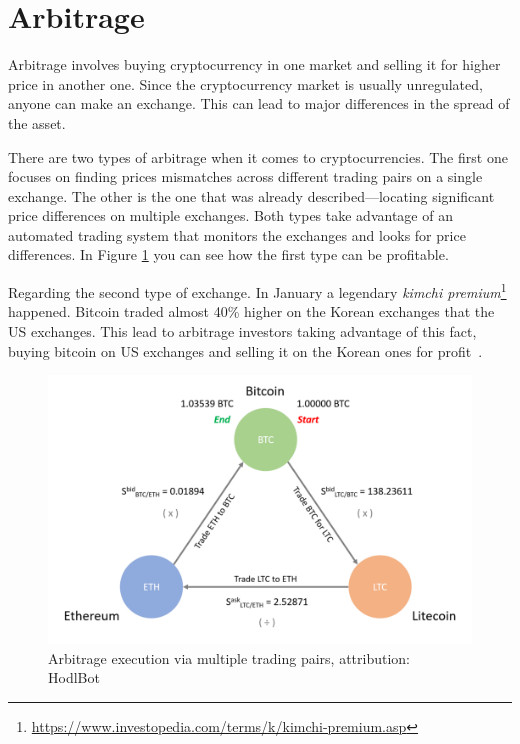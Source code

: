 \section{Arbitrage}
Arbitrage involves buying cryptocurrency in one market and selling it for higher price in another one. Since the cryptocurrency market is usually unregulated, anyone can make an exchange. This can lead to major differences in the spread of the asset.

There are two types of arbitrage when it comes to cryptocurrencies. The first one focuses on finding prices mismatches across different trading pairs on a single exchange. The other is the one that was already described---locating significant price differences on multiple exchanges. Both types take advantage of an automated trading system that monitors the exchanges and looks for price differences. In Figure \ref{arbitrage-figure} you can see how the first type can be profitable.

Regarding the second type of exchange. In January a legendary \emph{kimchi premium}\footnote{\url{https://www.investopedia.com/terms/k/kimchi-premium.asp}} happened. Bitcoin traded almost 40\% higher on the Korean exchanges that the US exchanges. This lead to arbitrage investors taking advantage of this fact, buying bitcoin on US exchanges and selling it on the Korean ones for profit~\cite{hodlbot:day-trading-cryptocurrency}.

\begin{figure}[!hbt]
    \centering
    \includegraphics[width=\columnwidth]{figures/arbitrage.png}
    \caption{Arbitrage execution via multiple trading pairs, attribution: HodlBot~\cite{hodlbot:day-trading-cryptocurrency}}
    \label{arbitrage-figure}
\end{figure}

